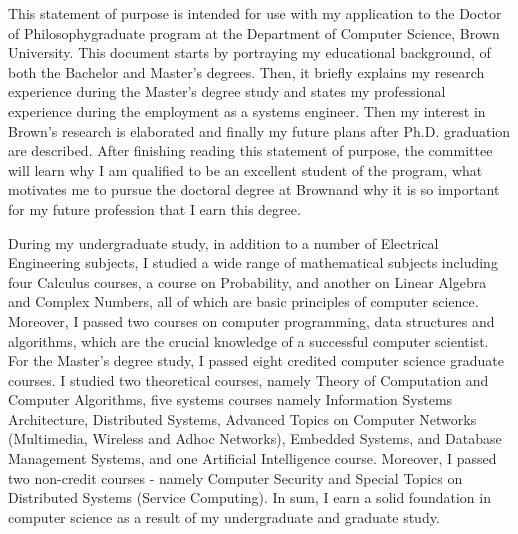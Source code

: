 \documentclass[a4paper,10pt]{report}
\newcommand{\university}{Brown University}
\newcommand{\department}{Department of Computer Science}
\newcommand{\uniabbre}{Brown}
\newcommand{\degree}{Doctor of Philosophy}
\begin{document}

\vspace{0.4cm}
This statement of purpose is intended for use with my application to the \degree \space graduate program at the \department, \university. This document starts by portraying my educational background, of both the Bachelor and Master's degrees. Then, it briefly explains my research experience during the Master's degree study and states my professional experience during the employment as a systems engineer. Then my interest in \uniabbre's research is elaborated and finally my future plans after Ph.D. graduation are described. After finishing reading this statement of purpose, the committee will learn why I am qualified to be an excellent student of the program, what motivates me to pursue the doctoral degree at \uniabbre \space and why it is so important for my future profession that I earn this degree.

\vspace{0.2cm}
During my undergraduate study, in addition to a number of Electrical Engineering subjects, I studied a wide range of mathematical subjects including four Calculus courses, a course on Probability, and another on Linear Algebra and Complex Numbers, all of which are basic principles of computer science. Moreover, I passed two courses on computer programming, data structures and algorithms, which are the crucial knowledge of a successful computer scientist. For the Master's degree study, I passed eight credited computer science graduate courses. I studied two theoretical courses, namely Theory of Computation and Computer Algorithms, five systems courses namely Information Systems Architecture, Distributed Systems, Advanced Topics on Computer Networks (Multimedia, Wireless and Adhoc Networks), Embedded Systems, and Database Management Systems, and one Artificial Intelligence course. Moreover, I passed two non-credit courses - namely Computer Security and Special Topics on Distributed Systems (Service Computing). In sum, I earn a solid foundation in computer science as a result of my undergraduate and graduate study. 
\end{document}

